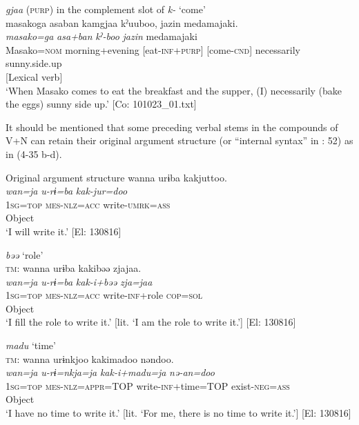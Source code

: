 \ex \textit{gjaa} (\textsc{purp}) in the complement slot of \textit{k-} ‘come’\\
\gllll masakoga  {\textbar}asaban{\textbar}  kamgjaa  kˀuuboo,  jazin   {\textbar}medamajaki{\textbar}.\\
      \textit{masako=ga}  \textit{asa+ban}  \textit{}  \textit{kˀ-boo}  \textit{jazin} medamajaki\\                                                                                                
      Masako=\textsc{nom}  morning+evening  [eat-\textsc{inf}+\textsc{purp}]  [come-\textsc{cnd}]  necessarily                       sunny.side.up\\
          [Complement]  [Lexical verb]\\
\glt  ‘When Masako comes to eat the breakfast and the supper, (I) necessarily (bake the eggs) sunny side up.’   [Co: 101023\_01.txt]
\z
\z

It should be mentioned that some preceding verbal stems in the compounds of V+N can retain their original argument structure (or “internal syntax” in \citealt{Haspelmath1996}: 52) as in (4-35 b-d).

\ea  
\ea Original argument structure \label{ex:4.35}
\gllll  wanna  urɨba  kakjuttoo.\\
    \textit{wan=ja}  \textit{u-rɨ=ba}  \textit{kak-jur=doo}\\
    1\textsc{sg}=\textsc{top}  \textsc{mes}-\textsc{nlz}=\textsc{acc}  write-\textsc{umrk}=\textsc{ass}\\
      Object  \\
    \glt     ‘I will write it.’ [El: 130816]

\ex \textit{bəə} ‘role’\\
\gllll  \textsc{tm}:  wanna  urɨba  kakibəə  zjajaa.\\
    \textit{wan=ja}  \textit{u-rɨ=ba}  \textit{kak-i+bəə}  \textit{zja=jaa}\\
    1\textsc{sg}=\textsc{top}  \textsc{mes}-\textsc{nlz}=\textsc{acc}  write-\textsc{inf}+role  \textsc{cop}=\textsc{sol}\\
      Object  \\
    \glt     ‘I fill the role to write it.’ [lit. ‘I am the role to write it.’] [El: 130816]

\ex \textit{madu} ‘time’\\
\gllll  \textsc{tm}:  wanna  urɨnkjoo  kakimadoo  nəndoo.\\
    \textit{wan=ja}  \textit{u-rɨ=nkja=ja}  \textit{kak-i+madu=ja}  \textit{nə-an=doo}\\
    1\textsc{sg}=\textsc{top}  \textsc{mes}-\textsc{nlz}=\textsc{appr}=TOP  write-\textsc{inf}+time=TOP  exist-\textsc{neg}=\textsc{ass}\\
      Object    \\
    \glt     ‘I have no time to write it.’ [lit. ‘For me, there is no time to write it.’] [El: 130816]

